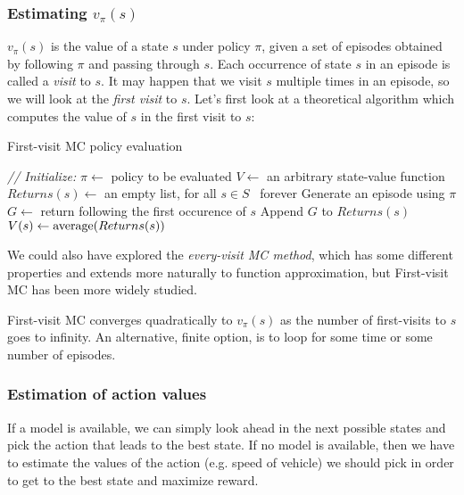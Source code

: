     \subsubsection{Estimating $v_\pi(s)$}
    $v_\pi(s)$ is the value of a state $s$ under policy $\pi$, given a set of 
    episodes obtained by following $\pi$ and passing through $s$. Each 
    occurrence of state $s$ in an episode is called a \textit{visit} to $s$. It 
    may happen that we visit $s$ multiple times in an episode, so we will look 
    at the \textit{first visit} to $s$. Let's first look at a theoretical 
    algorithm which computes the value of $s$ in the first visit to $s$:
    \begin{algorithm}
        \caption{First-visit MC policy evaluation}
        \begin{algorithmic}
            \State \textit{// Initialize:}
            \State $\pi \gets$ policy to be evaluated
            \State $V \gets $ an arbitrary state-value function
            \State $Returns(s) \gets $ an empty list, for all $s \in S$
            \State
            \Loop \, forever
                \State Generate an episode using $\pi$
                    \State $G \gets $ return following the first occurence of 
                    $s$
                    \State Append $G$ to $Returns(s)$
                    \State $V(s) \gets \text{average}(Returns(s))$
                \EndFor
            \EndLoop
        \end{algorithmic}
    \end{algorithm}
    
    We could also have explored the \textit{every-visit MC method}, which has 
    some different properties and extends more naturally to function 
    approximation, but First-visit MC has been more widely studied.
    
    First-visit MC converges quadratically to $v_\pi(s)$ as the number of 
    first-visits to $s$ 
    goes to infinity. An alternative, finite option, is to loop for some time 
    or some number of episodes.
    
    \subsubsection{Estimation of action values}
    If a model is available, we can simply look ahead in the next possible 
    states and pick the action that leads to the best state. If no model is 
    available, then we have to estimate the values of the action (e.g. speed of 
    vehicle) we should pick in order to get to the best state and maximize 
    reward.
    
